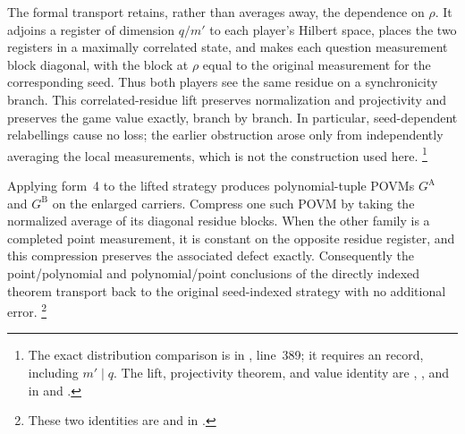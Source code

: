 \documentclass[11pt]{article}
\begin{document}
The formal transport retains, rather than averages away, the dependence on
$\rho$.  It adjoins a register of dimension $q/m'$ to each player's Hilbert
space, places the two registers in a maximally correlated state, and makes
each question measurement block diagonal, with the block at $\rho$ equal to
the original measurement for the corresponding seed.  Thus both players see
the same residue on a synchronicity branch.  This correlated-residue lift
preserves normalization and projectivity and preserves the game value exactly,
branch by branch.  In particular, seed-dependent relabellings cause no loss;
the earlier obstruction arose only from independently averaging the local
measurements, which is not the construction used here.%
\footnote{The exact distribution comparison is
 in
,
line~389; it requires an  record, including $m'\mid q$.
The lift, projectivity theorem, and value identity are
,
, and
 in
 and
.}

Applying form~4 to the lifted strategy produces polynomial-tuple POVMs
$G^{\mathrm A}$ and $G^{\mathrm B}$ on the enlarged carriers.  Compress one
such POVM by taking the normalized average of its diagonal residue blocks.
When the other family is a completed point measurement, it is constant on the opposite
residue register, and this compression preserves the associated defect
exactly.  Consequently the point/polynomial and polynomial/point conclusions
of the directly indexed theorem transport back to the original seed-indexed
strategy with no additional error.%
\footnote{These two identities are
 and
 in
.}
\end{document}
